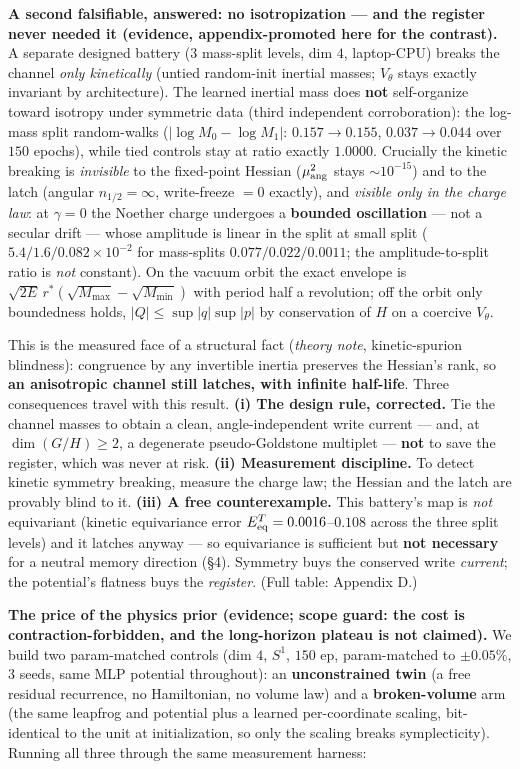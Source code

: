\documentclass[10pt]{article}
\begin{document}
\textbf{A second falsifiable, answered: no isotropization --- and the register never needed it (evidence, appendix-promoted here for the contrast).} A separate designed battery ($3$ mass-split levels, dim $4$, laptop-CPU) breaks the channel \emph{only kinetically} (untied random-init inertial masses; $V_\theta$ stays exactly invariant by architecture). The learned inertial mass does \textbf{not} self-organize toward isotropy under symmetric data (third independent corroboration): the log-mass split random-walks ($|\log M_0-\log M_1|$: $0.157\to0.155$, $0.037\to0.044$ over $150$ epochs), while tied controls stay at ratio exactly $1.0000$. Crucially the kinetic breaking is \emph{invisible} to the fixed-point Hessian ($\mu^2_{\rm ang}$ stays $\sim10^{-15}$) and to the latch (angular $n_{1/2}=\infty$, write-freeze $=0$ exactly), and \emph{visible only in the charge law}: at $\gamma=0$ the Noether charge undergoes a \textbf{bounded oscillation} --- not a secular drift --- whose amplitude is linear in the split at small split ($5.4/1.6/0.082\!\times\!10^{-2}$ for mass-splits $0.077/0.022/0.0011$; the amplitude-to-split ratio is \emph{not} constant). On the vacuum orbit the exact envelope is $\sqrt{2E}\,r^*(\sqrt{M_{\max}}-\sqrt{M_{\min}})$ with period half a revolution; off the orbit only boundedness holds, $|Q|\le\sup|q|\sup|p|$ by conservation of $H$ on a coercive $V_\theta$.

This is the measured face of a structural fact (\emph{theory note}, kinetic-spurion blindness): congruence by any invertible inertia preserves the Hessian's rank, so \textbf{an anisotropic channel still latches, with infinite half-life}. Three consequences travel with this result. \textbf{(i) The design rule, corrected.} Tie the channel masses to obtain a clean, angle-independent write current --- and, at $\dim(G/H)\ge2$, a degenerate pseudo-Goldstone multiplet --- \textbf{not} to save the register, which was never at risk. \textbf{(ii) Measurement discipline.} To detect kinetic symmetry breaking, measure the charge law; the Hessian and the latch are provably blind to it. \textbf{(iii) A free counterexample.} This battery's map is \emph{not} equivariant (kinetic equivariance error $E^T_{\rm eq}=0.0016$--$0.108$ across the three split levels) and it latches anyway --- so equivariance is sufficient but \textbf{not necessary} for a neutral memory direction (\S4). Symmetry buys the conserved write \emph{current}; the potential's flatness buys the \emph{register}. (Full table: Appendix D.)

\textbf{The price of the physics prior (evidence; scope guard: the cost is contraction-forbidden, and the long-horizon plateau is not claimed).} We build two param-matched controls (dim $4$, $S^1$, $150$ ep, param-matched to $\pm0.05\%$, $3$ seeds, same MLP potential throughout): an \textbf{unconstrained twin} (a free residual recurrence, no Hamiltonian, no volume law) and a \textbf{broken-volume} arm (the same leapfrog and potential plus a learned per-coordinate scaling, bit-identical to the unit at initialization, so only the scaling breaks symplecticity). Running all three through the same measurement harness:
\end{document}
